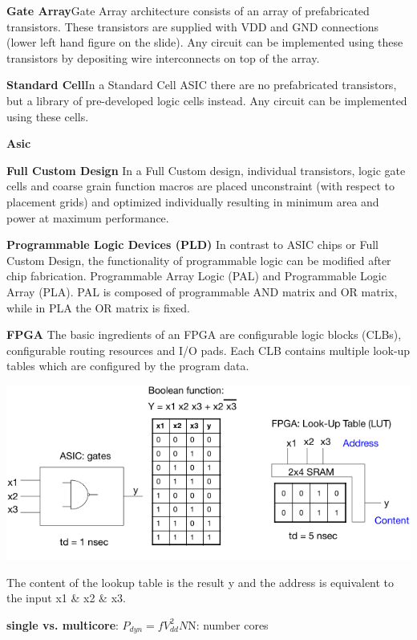 \documentclass[english]{latex4ei/latex4ei_sheet}
\begin{document}
\textbf{Gate Array}Gate Array architecture consists of an array of prefabricated transistors. These transistors are supplied with VDD and GND connections (lower left hand figure on the slide). Any circuit can be implemented using these transistors by depositing wire interconnects on top of the array.

\textbf{Standard Cell}In a Standard Cell ASIC there are no prefabricated transistors, but a library of pre-developed logic cells instead. Any circuit can be implemented using these cells.

\textbf{Asic}

\textbf{Full Custom Design}
In a Full Custom design, individual transistors, logic gate cells and coarse grain function macros are placed unconstraint (with respect to placement grids) and optimized individually resulting in minimum area and power at maximum performance.

\textbf{Programmable Logic Devices (PLD)}
In contrast to ASIC chips or Full Custom Design, the functionality of programmable logic can be modified after chip fabrication.
Programmable Array Logic (PAL) and Programmable Logic Array (PLA). PAL is composed of programmable AND matrix and OR matrix, while in PLA the OR matrix is fixed.

\textbf{FPGA}
The basic ingredients of an FPGA are configurable logic blocks (CLBs), configurable routing resources and I/O pads. Each CLB contains multiple look-up tables which are configured by the program data.

\begin{center}
  \includegraphics[width=\linewidth]{assets/FPGARealization.png}
  \label{fig:fpgarealization}
\end{center}

The content of the lookup table is the result y and the address is equivalent to the input x1 \& x2 \& x3.

\textbf{single vs. multicore}:
$P_{dyn} = f V_{dd}^2 N $\quad N: number cores
\end{document}
